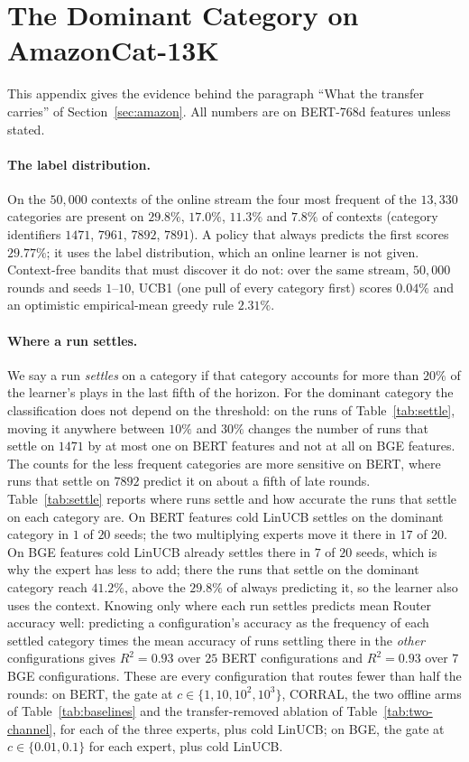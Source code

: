 \documentclass{article}
\theoremstyle{definition}
\theoremstyle{remark}
\theoremstyle{remark}
\begin{document}
\section{The Dominant Category on AmazonCat-13K}
\label{app:dominant}

This appendix gives the evidence behind the paragraph ``What the transfer
carries'' of Section~\ref{sec:amazon}. All numbers are on BERT-768d features
unless stated.

\paragraph{The label distribution.}
On the $50{,}000$ contexts of the online stream the four most frequent of the
$13{,}330$ categories are present on $29.8\%$, $17.0\%$, $11.3\%$ and $7.8\%$
of contexts (category identifiers $1471$, $7961$, $7892$, $7891$). A policy
that always predicts the first scores $29.77\%$; it uses the label
distribution, which an online learner is not given. Context-free bandits that
must discover it do not: over the same stream, $50{,}000$ rounds and seeds
$1$--$10$, UCB1 (one pull of every category first) scores $0.04\%$ and an
optimistic empirical-mean greedy rule $2.31\%$.

\paragraph{Where a run settles.}
We say a run \emph{settles} on a category if that category accounts for more
than $20\%$ of the learner's plays in the last fifth of the horizon. For the
dominant category the classification does not depend on the threshold: on the
runs of Table~\ref{tab:settle}, moving it anywhere between $10\%$ and $30\%$
changes the number of runs that settle on $1471$ by at most one on BERT
features and not at all on BGE features. The counts for the less frequent
categories are more sensitive on BERT, where runs that settle on $7892$
predict it on about a fifth of late rounds. Table~\ref{tab:settle}
reports where runs settle and how accurate the runs that settle on each
category are. On BERT features cold LinUCB settles on the dominant category
in $1$ of $20$ seeds; the two multiplying experts move it there in $17$ of
$20$. On BGE features cold LinUCB already settles there in $7$ of $20$ seeds,
which is why the expert has less to add; there the runs that settle on the
dominant category reach $41.2\%$, above the $29.8\%$ of always predicting
it, so the learner also uses the context. Knowing only where each run
settles predicts mean Router accuracy well: predicting a configuration's
accuracy as the frequency of each settled category times the mean accuracy
of runs settling there in the \emph{other} configurations gives $R^2=0.93$
over $25$ BERT configurations and $R^2=0.93$ over $7$ BGE configurations.
These are every configuration that routes fewer than half the rounds: on
BERT, the gate at $c\in\{1,10,10^2,10^3\}$, CORRAL, the two offline arms of
Table~\ref{tab:baselines} and the transfer-removed ablation of
Table~\ref{tab:two-channel}, for each of the three experts, plus cold
LinUCB; on BGE, the gate at $c\in\{0.01,0.1\}$ for each expert, plus cold
LinUCB.
\end{document}
